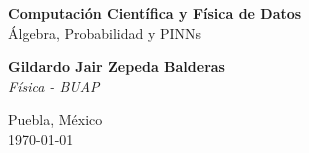 \begin{titlepage}
	\centering
	\vspace*{1cm}
	
	\Huge
	\textbf{Computación Científica y Física de Datos} \\
	\vspace{0.5cm}
	\LARGE
	Álgebra, Probabilidad y PINNs
	
	\vspace{1.5cm}
	
	\textbf{Gildardo Jair Zepeda Balderas} \\
	\textit{Física - BUAP}
	
	\vfill
	
	
	\vfill
	
	\Large
	Puebla, México \\
	\today
	
\end{titlepage}
